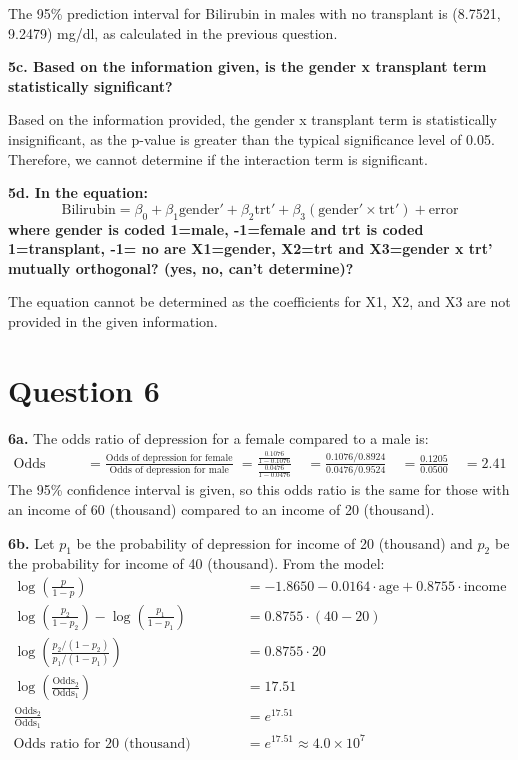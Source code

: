 \documentclass{article}
\begin{document}
The 95\% prediction interval for Bilirubin in males with no transplant is (8.7521, 9.2479) mg/dl, as calculated in the previous question.

\textbf{5c. Based on the information given, is the gender x transplant term statistically significant?}

Based on the information provided, the gender x transplant term is statistically insignificant, as the p-value is greater than the typical significance level of 0.05. Therefore, we cannot determine if the interaction term is significant.

\textbf{5d. In the equation: 
\[ \text{Bilirubin} = \beta_0 + \beta_1 \text{gender}' + \beta_2 \text{trt}' + \beta_3 (\text{gender}' \times \text{trt}') + \text{error} \]
where gender is coded 1=male, -1=female and trt is coded 1=transplant, -1= no are X1=gender, X2=trt and X3=gender x trt' mutually orthogonal? (yes, no, can't determine)?}

The equation cannot be determined as the coefficients for X1, X2, and X3 are not provided in the given information.

\section{Question 6}
\textbf{6a.}
The odds ratio of depression for a female compared to a male is:
\begin{align*}
\text{Odds ratio} &= \frac{\text{Odds of depression for female}}{\text{Odds of depression for male}} \
&= \frac{\frac{0.1076}{1-0.1076}}{\frac{0.0476}{1-0.0476}} \
&= \frac{0.1076 / 0.8924}{0.0476 / 0.9524} \
&= \frac{0.1205}{0.0500} \
&= 2.41
\end{align*}
The 95\% confidence interval is given, so this odds ratio is the same for those with an income of 60 (thousand) compared to an income of 20 (thousand).

\textbf{6b.}
Let $p_1$ be the probability of depression for income of 20 (thousand) and $p_2$ be the probability for income of 40 (thousand). From the model:
\begin{equation*}
\begin{split}
\log\left(\frac{p}{1-p}\right) &= -1.8650 - 0.0164 \cdot \text{age} + 0.8755 \cdot \text{income} \\
\log\left(\frac{p_2}{1-p_2}\right) - \log\left(\frac{p_1}{1-p_1}\right) &= 0.8755 \cdot (40 - 20) \\
\log\left(\frac{p_2/(1-p_2)}{p_1/(1-p_1)}\right) &= 0.8755 \cdot 20 \\
\log\left(\frac{\text{Odds}_2}{\text{Odds}_1}\right) &= 17.51 \\
\frac{\text{Odds}_2}{\text{Odds}_1} &= e^{17.51} \\
\text{Odds ratio for 20 (thousand) increase} &= e^{17.51} \approx 4.0 \times 10^7
\end{split}
\end{equation*}
\end{document}
